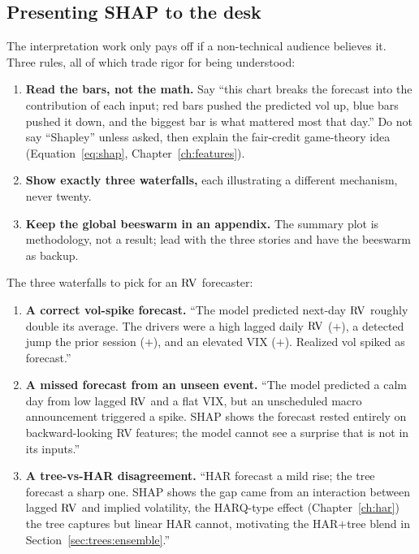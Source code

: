 \subsection{Presenting SHAP to the desk}

The interpretation work only pays off if a non-technical audience believes
it.  Three rules, all of which trade rigor for being understood:

\begin{enumerate}[leftmargin=1.8em]
\item \textbf{Read the bars, not the math.}  Say ``this chart breaks the
  forecast into the contribution of each input; red bars pushed the
  predicted vol up, blue bars pushed it down, and the biggest bar is what
  mattered most that day.''  Do not say ``Shapley'' unless asked, then
  explain the fair-credit game-theory idea
  (Equation~\ref{eq:shap}, Chapter~\ref{ch:features}).
\item \textbf{Show exactly three waterfalls,} each illustrating a different
  mechanism, never twenty.
\item \textbf{Keep the global beeswarm in an appendix.}  The summary plot is
  methodology, not a result; lead with the three stories and have the
  beeswarm as backup.
\end{enumerate}

The three waterfalls to pick for an $\operatorname{RV}$ forecaster:
\begin{enumerate}[leftmargin=1.8em]
  \item \textbf{A correct vol-spike forecast.}  ``The model predicted
        next-day $\operatorname{RV}$ roughly double its average.  The drivers were a high
        lagged daily $\operatorname{RV}$ ($+$), a detected jump the prior session ($+$),
        and an elevated VIX ($+$).  Realized vol spiked as forecast.''
  \item \textbf{A missed forecast from an unseen event.}  ``The model
        predicted a calm day from low lagged $\operatorname{RV}$ and a flat VIX, but an
        unscheduled macro announcement triggered a spike.  SHAP shows the
        forecast rested entirely on backward-looking RV features; the model
        cannot see a surprise that is not in its inputs.''
  \item \textbf{A tree-vs-HAR disagreement.}  ``HAR forecast a mild rise;
        the tree forecast a sharp one.  SHAP shows the gap came from an
        interaction between lagged $\operatorname{RV}$ and implied volatility, the
        HARQ-type effect (Chapter~\ref{ch:har}) the tree captures but linear
        HAR cannot, motivating the HAR$+$tree blend in
        Section~\ref{sec:trees:ensemble}.''
\end{enumerate}

